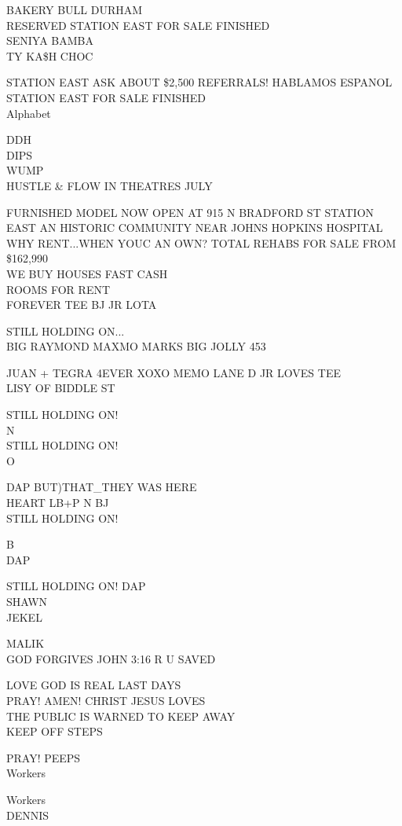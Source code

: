 \documentclass[10pt,letterpaper]{article}
\begin{document}
BAKERY BULL DURHAM\\
RESERVED STATION EAST FOR SALE FINISHED\\
SENIYA BAMBA\\
TY KA\$H CHOC

STATION EAST ASK ABOUT \$2,500 REFERRALS!  HABLAMOS ESPANOL\\
STATION EAST FOR SALE FINISHED\\
Alphabet

DDH\\
DIPS\\
WUMP\\
HUSTLE \& FLOW IN THEATRES JULY

FURNISHED MODEL NOW OPEN AT 915 N BRADFORD ST STATION EAST AN HISTORIC COMMUNITY NEAR JOHNS HOPKINS HOSPITAL WHY RENT...WHEN YOUC AN OWN?  TOTAL REHABS FOR SALE FROM \$162,990\\
WE BUY HOUSES FAST CASH\\
ROOMS FOR RENT\\
FOREVER TEE BJ JR LOTA

STILL HOLDING ON...\\
BIG RAYMOND MAXMO MARKS BIG JOLLY 453

JUAN + TEGRA 4EVER XOXO MEMO LANE D JR LOVES TEE\\
LISY OF BIDDLE ST

STILL HOLDING ON!\\
N\\
STILL HOLDING ON!\\
O

DAP BUT)THAT\_THEY WAS HERE\\
HEART LB+P N BJ\\
STILL HOLDING ON!

B\\
DAP

STILL HOLDING ON!  DAP\\
SHAWN\\
JEKEL

MALIK\\
GOD FORGIVES JOHN 3:16 R U SAVED

LOVE GOD IS REAL LAST DAYS\\
PRAY!  AMEN!  CHRIST JESUS LOVES\\
THE PUBLIC IS WARNED TO KEEP AWAY\\
KEEP OFF STEPS

PRAY!  PEEPS\\
Workers

Workers\\
DENNIS
\end{document}

